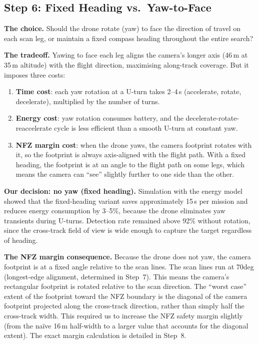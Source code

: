 \documentclass[10pt,a4paper]{article}
\def\textdegree{deg}%
\begin{document}
\subsection{Step 6: Fixed Heading vs.\ Yaw-to-Face}\label{sec:step6}

\textbf{The choice.} Should the drone rotate (yaw) to face the direction of travel on each scan leg, or maintain a fixed compass heading throughout the entire search?

\textbf{The tradeoff.} Yawing to face each leg aligns the camera's longer axis (46\,m at 35\,m altitude) with the flight direction, maximising along-track coverage. But it imposes three costs:

\begin{enumerate}[nosep]
  \item \textbf{Time cost}: each yaw rotation at a U-turn takes 2--4\,s (accelerate, rotate, decelerate), multiplied by the number of turns.
  \item \textbf{Energy cost}: yaw rotation consumes battery, and the decelerate-rotate-reaccelerate cycle is less efficient than a smooth U-turn at constant yaw.
  \item \textbf{NFZ margin cost}: when the drone yaws, the camera footprint rotates with it, so the footprint is always axis-aligned with the flight path. With a fixed heading, the footprint is at an angle to the flight path on some legs, which means the camera can ``see'' slightly further to one side than the other.
\end{enumerate}

\textbf{Our decision: no yaw (fixed heading).} Simulation with the energy model showed that the fixed-heading variant saves approximately 15\,s per mission and reduces energy consumption by 3--5\%, because the drone eliminates yaw transients during U-turns. Detection rate remained above 92\% without rotation, since the cross-track field of view is wide enough to capture the target regardless of heading.

\textbf{The NFZ margin consequence.} Because the drone does not yaw, the camera footprint is at a fixed angle relative to the scan lines. The scan lines run at 70\textdegree{} (longest-edge alignment, determined in Step~7). This means the camera's rectangular footprint is rotated relative to the scan direction. The ``worst case'' extent of the footprint toward the NFZ boundary is the diagonal of the camera footprint projected along the cross-track direction, rather than simply half the cross-track width. This required us to increase the NFZ safety margin slightly (from the na\"ive 16\,m half-width to a larger value that accounts for the diagonal extent). The exact margin calculation is detailed in Step~8.
\end{document}
